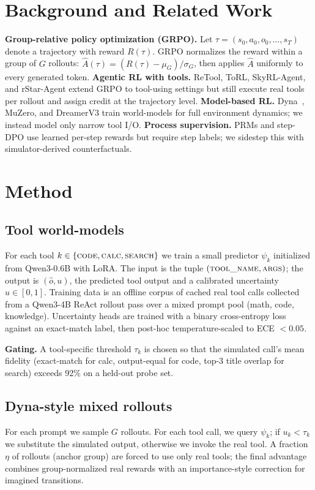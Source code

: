 \documentclass{article}
\begin{document}
\section{Background and Related Work}\label{sec:related}
\textbf{Group-relative policy optimization (GRPO).} Let $\tau = (s_0, a_0, o_0, \dots, s_T)$ denote a trajectory with reward $R(\tau)$. GRPO normalizes the reward within a group of $G$ rollouts: $\hat{A}(\tau) = (R(\tau) - \mu_G)/\sigma_G$, then applies $\hat{A}$ uniformly to every generated token.
\textbf{Agentic RL with tools.} ReTool, ToRL, SkyRL-Agent, and rStar-Agent extend GRPO to tool-using settings but still execute real tools per rollout and assign credit at the trajectory level. \textbf{Model-based RL.} Dyna~\cite{sutton1991dyna}, MuZero, and DreamerV3 train world-models for full environment dynamics; we instead model only narrow tool I/O. \textbf{Process supervision.} PRMs and step-DPO use learned per-step rewards but require step labels; we sidestep this with simulator-derived counterfactuals.

\section{Method}\label{sec:method}

\subsection{Tool world-models}\label{sec:predictor}
For each tool $k \in \{\textsc{code}, \textsc{calc}, \textsc{search}\}$ we train a small predictor $\psi_k$ initialized from Qwen3-0.6B with LoRA. The input is the tuple $(\textsc{tool\_name}, \textsc{args})$; the output is $(\hat{o}, u)$, the predicted tool output and a calibrated uncertainty $u \in [0,1]$. Training data is an offline corpus of cached real tool calls collected from a Qwen3-4B ReAct rollout pass over a mixed prompt pool (math, code, knowledge). Uncertainty heads are trained with a binary cross-entropy loss against an exact-match label, then post-hoc temperature-scaled to ECE $< 0.05$.

\textbf{Gating.} A tool-specific threshold $\tau_k$ is chosen so that the simulated call's mean fidelity (exact-match for calc, output-equal for code, top-3 title overlap for search) exceeds 92\% on a held-out probe set.

\subsection{Dyna-style mixed rollouts}\label{sec:mixed}
For each prompt we sample $G$ rollouts. For each tool call, we query $\psi_k$; if $u_k < \tau_k$ we substitute the simulated output, otherwise we invoke the real tool. A fraction $\eta$ of rollouts (anchor group) are forced to use only real tools; the final advantage combines group-normalized real rewards with an importance-style correction for imagined transitions.
\end{document}

